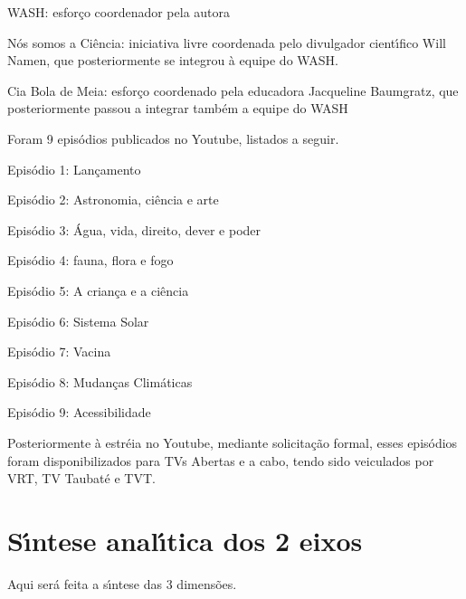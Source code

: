 \documentclass[
12pt,		%
openright,	%
twoside,  %
a4paper,			%
chapter=TITLE,		%
english,			%
french,				%
spanish,			%
brazil				%
]{USPSC-classe/USPSC}
\begin{document}
\begin{alineas}
\item WASH: esfor\c{c}o coordenador pela autora
\item \textquotedbl N\'os somos a Ci\^encia\textquotedbl : iniciativa livre coordenada pelo divulgador cient\'{\i}fico Will Namen, que posteriormente se integrou \`a equipe do WASH.
\item Cia Bola de Meia: esfor\c{c}o coordenado pela educadora Jacqueline Baumgratz, que posteriormente passou a integrar tamb\'em a equipe do WASH
\end{alineas}

Foram 9 epis\'odios publicados no Youtube, listados a seguir.











\begin{alineas}
\item Epis\'odio 1: Lan\c{c}amento
\item Epis\'odio 2: Astronomia, ci\^encia e arte
\item Epis\'odio 3: \'Agua, vida, direito, dever e poder
\item Epis\'odio 4: fauna, flora e fogo
\item Epis\'odio 5: A crian\c{c}a e a ci\^encia
\item Epis\'odio 6: Sistema Solar
\item Epis\'odio 7: Vacina
\item Epis\'odio 8: Mudan\c{c}as Clim\'aticas
\item Epis\'odio 9: Acessibilidade
\end{alineas}

Posteriormente \`a estr\'eia no Youtube, mediante solicita\c{c}\~ao formal, esses epis\'odios foram disponibilizados para TVs Abertas e \textquotedbl a cabo\textquotedbl , tendo sido veiculados por VRT, TV Taubat\'e e TVT.










\section[S\'{\i}ntese anal\'{\i}tica dos 2 eixos]{S\'{\i}ntese anal\'{\i}tica dos 2 eixos}\label{S\'{\i}ntese anal\'{\i}tica dos 2 eixos}
Aqui ser\'a feita a s\'{\i}ntese das 3 dimens\~oes.
\end{document}
